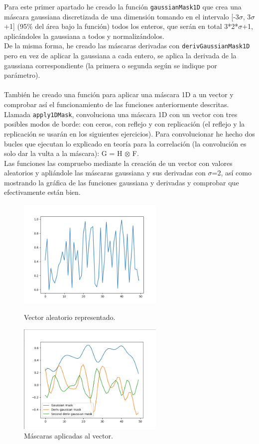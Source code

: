 \documentclass[12pt]{article}
\begin{document}
Para este primer apartado he creado la función \texttt{gaussianMask1D} que crea una máscara gaussiana discretizada de una dimensión tomando en el intervalo [-3$\sigma$, 3$\sigma$+1] (95$\%$ del área bajo la función) todos los enteros, que serán en total 3*2*$\sigma$+1, aplicándoles la gaussiana a todos y normalizándolos.\\
De la misma forma, he creado las máscaras derivadas con \texttt{derivGaussianMask1D} pero en vez de aplicar la gaussiana a cada entero, se aplica la derivada de la gaussiana correspondiente (la primera o segunda según se indique por parámetro).\\\\
También he creado una función para aplicar una máscara 1D a un vector y comprobar así el funcionamiento de las funciones anteriormente descritas. Llamada \texttt{apply1DMask}, convoluciona una máscara 1D con un vector con tres posibles modos de borde: con ceros, con reflejo y con replicación (el reflejo y la replicación se usarán en los siguientes ejercicios). Para convolucionar he hecho dos bucles que ejecutan lo explicado en teoría para la correlación (la convolución es solo dar la vulta a la máscara): G = H $\otimes$ F.\\
Las funciones las compruebo mediante la creación de un vector con valores aleatorios y apliándole las máscaras gaussiana y sus derivadas con $\sigma$=2, así como mostrando la gráfica de las funciones gaussiana y derivadas y comprobar que efectivamente están bien.

\begin{figure}[H]
\centering
\parbox{7cm}{
\includegraphics[width=7cm]{images/VectorAleat.png}
\caption{Vector aleatorio representado.}
\label{fig:2figsA}}
\qquad
\begin{minipage}{7cm}
\includegraphics[width=7cm]{images/VectorAleatMask.png}
\caption{Máscaras aplicadas al vector.}
\label{fig:2figsB}
\end{minipage}
\end{figure}
\end{document}
